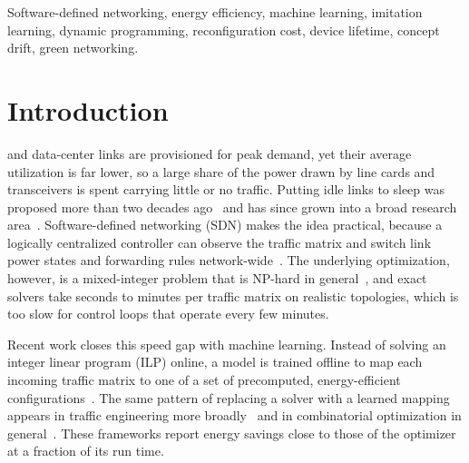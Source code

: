 \documentclass[journal]{IEEEtran}
\newif\ifplaceholders
\begin{document}
\begin{IEEEkeywords}
Software-defined networking, energy efficiency, machine learning, imitation learning, dynamic programming, reconfiguration cost, device lifetime, concept drift, green networking.
\end{IEEEkeywords}

\ifplaceholders
\noindent\fcolorbox{cRed}{cRed!6}{\parbox{0.96\columnwidth}{\footnotesize\textbf{Draft notice.} All experimental values in this version (abstract, Section~\ref{sec:motivation}, Tables~\ref{tab:main}--\ref{tab:emu}, Figs.~\ref{fig:motivation} and~\ref{fig:pareto}--\ref{fig:sensitivity}) are planning placeholders generated by \texttt{paper/tools/make\_placeholder\_data.py}. They must be replaced by measured values before submission. Set \texttt{\textbackslash placeholdersfalse} only after that replacement.}}
\fi

\section{Introduction}

 and data-center links are provisioned for peak demand, yet their average utilization is far lower, so a large share of the power drawn by line cards and transceivers is spent carrying little or no traffic. Putting idle links to sleep was proposed more than two decades ago~\cite{gupta2003greening} and has since grown into a broad research area~\cite{bianzino2012survey,bolla2011energy}. Software-defined networking (SDN) makes the idea practical, because a logically centralized controller can observe the traffic matrix and switch link power states and forwarding rules network-wide~\cite{mckeown2008openflow,kreutz2015sdn}. The underlying optimization, however, is a mixed-integer problem that is NP-hard in general~\cite{chiaraviglio2012minimizing}, and exact solvers take seconds to minutes per traffic matrix on realistic topologies, which is too slow for control loops that operate every few minutes.

Recent work closes this speed gap with machine learning. Instead of solving an integer linear program (ILP) online, a model is trained offline to map each incoming traffic matrix to one of a set of precomputed, energy-efficient configurations~\cite{gomezdelahiz2025noms,gomezdelahiz2026tgcn}. The same pattern of replacing a solver with a learned mapping appears in traffic engineering more broadly~\cite{xu2023teal,perry2023dote,abuzaid2021ncflow,almasan2022enero} and in combinatorial optimization in general~\cite{bengio2021mlco}. These frameworks report energy savings close to those of the optimizer at a fraction of its run time.
\end{document}
